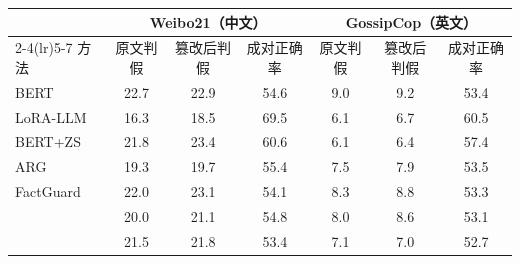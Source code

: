 \begin{tabular}{lcccccc}
\toprule
 & \multicolumn{3}{c}{Weibo21（中文）} & \multicolumn{3}{c}{GossipCop（英文）} \\
\cmidrule(lr){2-4}\cmidrule(lr){5-7}
方法 & 原文判假 & 篡改后判假 & 成对正确率 & 原文判假 & 篡改后判假 & 成对正确率 \\
\midrule
BERT & 22.7 & 22.9 & 54.6 & 9.0 & 9.2 & 53.4 \\
LoRA-LLM & 16.3 & 18.5 & 69.5 & 6.1 & 6.7 & 60.5 \\
BERT+ZS & 21.8 & 23.4 & 60.6 & 6.1 & 6.4 & 57.4 \\
ARG & 19.3 & 19.7 & 55.4 & 7.5 & 7.9 & 53.5 \\
FactGuard & 22.0 & 23.1 & 54.1 & 8.3 & 8.8 & 53.3 \\
\method{} & 20.0 & 21.1 & 54.8 & 8.0 & 8.6 & 53.1 \\
\student{} & 21.5 & 21.8 & 53.4 & 7.1 & 7.0 & 52.7 \\
\bottomrule
\end{tabular}
